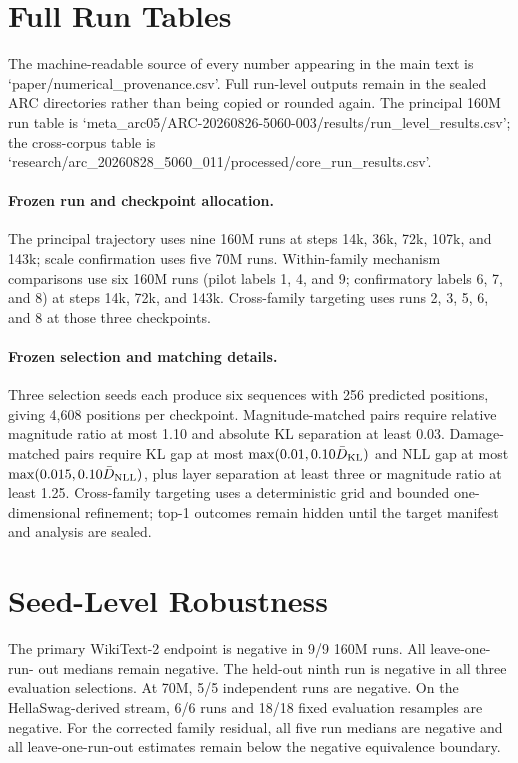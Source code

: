\section{Full Run Tables}
\label{app:contract}

The machine-readable source of every number appearing in the main text is
`paper/numerical\_provenance.csv'. Full run-level outputs remain in the sealed
ARC directories rather than being copied or rounded again. The principal 160M
run table is `meta\_arc05/ARC-20260826-5060-003/results/run\_level\_results.csv';
the cross-corpus table is
`research/arc\_20260828\_5060\_011/processed/core\_run\_results.csv'.

\paragraph{Frozen run and checkpoint allocation.}
The principal trajectory uses nine 160M runs at steps 14k, 36k, 72k, 107k,
and 143k; scale confirmation uses five 70M runs. Within-family mechanism
comparisons use six 160M runs (pilot labels 1, 4, and 9; confirmatory labels 6,
7, and 8) at steps 14k, 72k, and 143k. Cross-family targeting uses runs 2, 3,
5, 6, and 8 at those three checkpoints.

\paragraph{Frozen selection and matching details.}
Three selection seeds each produce six sequences with 256 predicted positions,
giving 4,608 positions per checkpoint. Magnitude-matched pairs require relative
magnitude ratio at most 1.10 and absolute KL separation at least 0.03.
Damage-matched pairs require KL gap at most
$\max(0.01,0.10\bar D_{\rm KL})$ and NLL gap at most
$\max(0.015,0.10\bar D_{\rm NLL})$, plus layer separation at least three or
magnitude ratio at least 1.25. Cross-family targeting uses a deterministic grid
and bounded one-dimensional refinement; top-1 outcomes remain hidden until the
target manifest and analysis are sealed.

\section{Seed-Level Robustness}

The primary WikiText-2 endpoint is negative in 9/9 160M runs. All leave-one-run-
out medians remain negative. The held-out ninth run is negative in all three
evaluation selections. At 70M, 5/5 independent runs are negative. On the
HellaSwag-derived stream, 6/6 runs and 18/18 fixed evaluation resamples are
negative. For the corrected family residual, all five run medians are negative
and all leave-one-run-out estimates remain below the negative equivalence
boundary.

